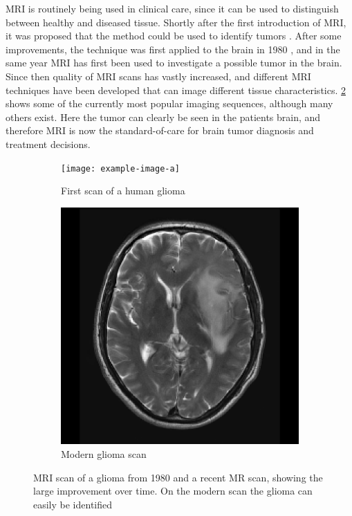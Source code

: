 \gls{MRI} is routinely being used in clinical care, since it can be used to distinguish between healthy and diseased tissue.
Shortly after the first introduction of \gls{MRI}, it was proposed that the method could be used to identify tumors \autocite{damadian1971tumor}.
After some improvements, the technique was first applied to the brain in 1980 \autocite{holland1980brain}, and in the same year MRI has first been used to investigate a possible tumor in the brain.
Since then quality of \gls{MRI} scans has vastly increased, and different \gls{MRI} techniques have been developed that can image different tissue characteristics.
\cref{fig:intro_MR_modern} shows some of the currently most popular imaging sequences, although many others exist.
Here the tumor can clearly be seen in the patients brain, and therefore \gls{MRI} is now the standard-of-care for brain tumor diagnosis and treatment decisions.

\begin{figure}[hbt]
    \centering
    \begin{subfigure}[b]{0.45\textwidth}
        \centering
        \texttt{[image: example-image-a]}
        \caption{First scan of a human glioma}\label{fig:intro_MR_first}
    \end{subfigure}
    \begin{subfigure}[b]{0.45\textwidth}
        \centering
        \includegraphics[width=\textwidth]{Figures/T2_LGG.png}
        \caption{Modern glioma scan}\label{fig:intro_MR_modern}
    \end{subfigure}
    \caption{\acrshort{MRI} scan of a glioma from 1980 and a recent \acrshort{MR} scan, showing the large improvement over time. On the modern scan the glioma can easily be identified}\label{fig:intro_MR_comparison}
\end{figure}

